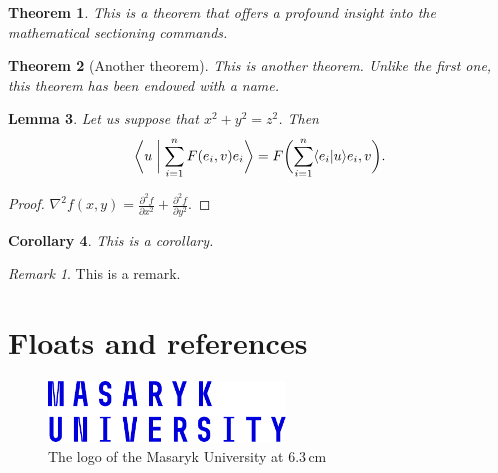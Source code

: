 \documentclass[
  digital,     %
  oneside,     %
  nosansbold,  %
  nocolorbold, %
  lof,         %
  lot,         %
]{fithesis4}
\begin{document}
\newtheorem{theorem}{Theorem}[section] %
\newtheorem{lemma}[theorem]{Lemma}         %
\newtheorem{corollary}[theorem]{Corollary} %
\theoremstyle{definition}
\newtheorem{definition}{Definition}
\theoremstyle{remark}
\newtheorem*{remark}{Remark}

\begin{theorem}
  This is a theorem that offers a profound insight into the
  mathematical sectioning commands.
\end{theorem}
\begin{theorem}[Another theorem]
  This is another theorem. Unlike the first one, this theorem has
  been endowed with a name.
\end{theorem}
\begin{lemma}
  Let us suppose that $x^2+y^2=z^2$. Then
  \begin{equation}
    \biggl\langle u\biggm|\sum_{i=1}^nF(e_i,v)e_i\biggr\rangle
    =F\biggl(\sum_{i=1}^n\langle e_i|u\rangle e_i,v\biggr).
  \end{equation}
\end{lemma}
\begin{proof}
  $\nabla^2 f(x,y)=\frac{\partial^2f}{\partial x^2}+
   \frac{\partial^2f}{\partial y^2}$.
\end{proof}
\begin{corollary}
  This is a corollary.
\end{corollary}
\begin{remark}
  This is a remark.
\end{remark}

\chapter{Floats and references}
\begin{figure}
  \begin{center}
    \includegraphics[width=6.3cm]{fithesis/logo/mu/fithesis-base-english-color}
  \end{center}
  \caption{The logo of the Masaryk University at 6.3\,cm}
  \label{fig:mulogo1}
\end{figure}
\end{document}
